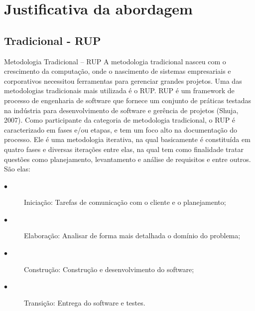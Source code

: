 \chapter{Justificativa da abordagem}

  \section{Tradicional - RUP}
  Metodologia Tradicional – RUP
            A metodologia tradicional nasceu com o crescimento da computação, onde o nascimento de sistemas empresariais e corporativos necessitou ferramentas para gerenciar grandes projetos. Uma das metodologias tradicionais mais utilizada é o RUP.
            RUP é um framework de processo de engenharia de software que fornece um conjunto de práticas testadas na indústria para desenvolvimento de software e gerência de projetos (Shuja, 2007). Como participante da categoria de metodologia tradicional, o RUP é caracterizado em fases e/ou etapas, e tem um foco alto na documentação do processo.
            Ele é uma metodologia iterativa, na qual basicamente é constituída em quatro fases e diversas iterações entre elas, na qual tem como finalidade tratar questões como planejamento, levantamento e análise de requisitos e entre outros. São elas:
          	\begin{description}
          	\item[$\bullet$] Iniciação: Tarefas de comunicação com o cliente e o planejamento;
          	\item[$\bullet$] Elaboração: Analisar de forma mais detalhada o domínio do problema;
          	\item[$\bullet$] Construção: Construção e desenvolvimento do software;
          	\item[$\bullet$] Transição: Entrega do software e testes.
          	\end{description}
         
